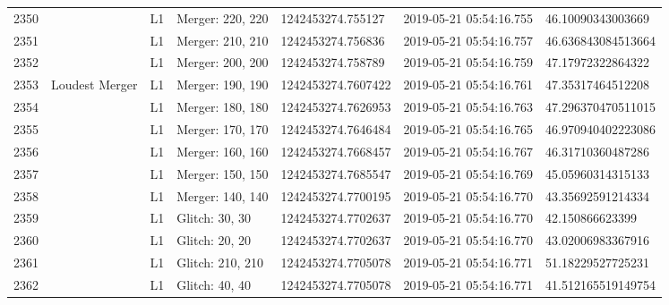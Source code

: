 \begin{longtable}{lllllll}
2350 &                                                    &       L1 &  Merger: 220, 220 &   1242453274.755127 &  2019-05-21 05:54:16.755 &   46.10090343003669 \\
2351 &                                                    &       L1 &  Merger: 210, 210 &   1242453274.756836 &  2019-05-21 05:54:16.757 &  46.636843084513664 \\
2352 &                                                    &       L1 &  Merger: 200, 200 &   1242453274.758789 &  2019-05-21 05:54:16.759 &   47.17972322864322 \\
2353 &                                     Loudest Merger &       L1 &  Merger: 190, 190 &  1242453274.7607422 &  2019-05-21 05:54:16.761 &   47.35317464512208 \\
2354 &                                                    &       L1 &  Merger: 180, 180 &  1242453274.7626953 &  2019-05-21 05:54:16.763 &  47.296370470511015 \\
2355 &                                                    &       L1 &  Merger: 170, 170 &  1242453274.7646484 &  2019-05-21 05:54:16.765 &  46.970940402223086 \\
2356 &                                                    &       L1 &  Merger: 160, 160 &  1242453274.7668457 &  2019-05-21 05:54:16.767 &   46.31710360487286 \\
2357 &                                                    &       L1 &  Merger: 150, 150 &  1242453274.7685547 &  2019-05-21 05:54:16.769 &   45.05960314315133 \\
2358 &                                                    &       L1 &  Merger: 140, 140 &  1242453274.7700195 &  2019-05-21 05:54:16.770 &   43.35692591214334 \\
2359 &                                                    &       L1 &    Glitch: 30, 30 &  1242453274.7702637 &  2019-05-21 05:54:16.770 &     42.150866623399 \\
2360 &                                                    &       L1 &    Glitch: 20, 20 &  1242453274.7702637 &  2019-05-21 05:54:16.770 &   43.02006983367916 \\
2361 &                                                    &       L1 &  Glitch: 210, 210 &  1242453274.7705078 &  2019-05-21 05:54:16.771 &   51.18229527725231 \\
2362 &                                                    &       L1 &    Glitch: 40, 40 &  1242453274.7705078 &  2019-05-21 05:54:16.771 &  41.512165519149754 \\

\end{longtable}
